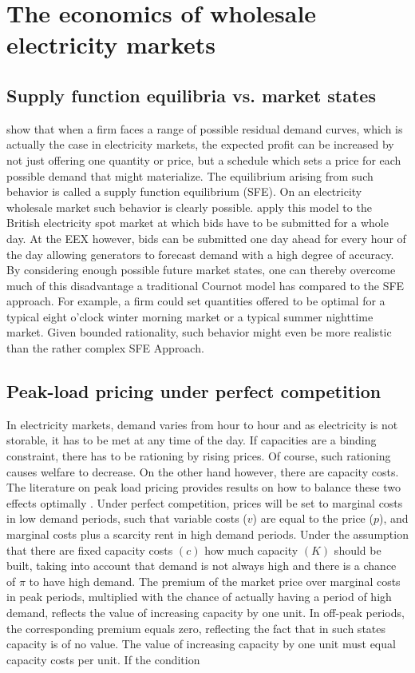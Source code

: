 \section{The economics of wholesale electricity markets} \label{sect:3}

\subsection{Supply function equilibria vs. market states}

\cite{Klemperer1989} show that when a firm faces a range of possible residual demand curves, which is actually the case in electricity markets, the expected profit can be increased by not just offering one quantity or price, but a schedule which sets a price for each possible demand that might materialize. The equilibrium arising from such behavior is called a supply function equilibrium (SFE). On an electricity wholesale market such behavior is clearly possible. \cite{Green1992} apply this model to the British electricity spot market at which bids have to be submitted for a whole day. At the EEX however, bids can be submitted one day ahead for every hour of the day allowing generators to forecast demand with a high degree of accuracy. By considering enough possible future market states, one can thereby overcome much of this disadvantage a traditional Cournot model has compared to the SFE approach. For example, a firm could set quantities offered to be optimal for a typical eight o'clock winter morning market or a typical summer nighttime market. Given bounded rationality, such behavior might even be more realistic than the rather complex SFE Approach.

\subsection{Peak-load pricing under perfect competition}

In electricity markets, demand varies from hour to hour and as electricity is not storable, it has to be met at any time of the day. If capacities are a binding constraint, there has to be rationing by rising prices. Of course, such rationing causes welfare to decrease. On the other hand however, there are capacity costs. The literature on peak load pricing provides results on how to balance these two effects optimally \citep[see][]{Crew1986}. Under perfect competition, prices will be set to marginal costs in low demand periods, such that variable costs ($v$) are equal to the price ($p$), and marginal costs plus a scarcity rent in high demand periods. Under the assumption that there are fixed capacity costs $(c)$ how much capacity $(K)$ should be built, taking into account that demand is not always high and there is a chance of $\pi$ to have high demand. The premium of the market price over marginal costs in peak periods, multiplied with the chance of actually having a period of high demand, reflects the value of increasing capacity by one unit. In off-peak periods, the corresponding premium equals zero, reflecting the fact that in such states capacity is of no value. The value of increasing capacity by one unit must equal capacity costs per unit. If the condition

